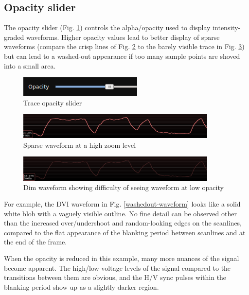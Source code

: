 \subsection{Opacity slider}

The opacity slider (Fig. \ref{opacityslider}) controls the alpha/opacity used to display intensity-graded waveforms.
Higher opacity values lead to better display of sparse waveforms (compare the crisp lines of Fig. \ref{sparse-waveform}
to the barely visible trace in Fig. \ref{dim-waveform}) but can lead to a washed-out appearance if too many sample
points are shoved into a small area.

\begin{figure}[H]
\centering
\includegraphics[height=1cm]{images/opacity-slider.png}
\caption{Trace opacity slider}
\label{opacityslider}
\end{figure}

\begin{figure}[H]
\centering
\includegraphics[width=10cm]{images/sparse-waveform.png}
\caption{Sparse waveform at a high zoom level}
\label{sparse-waveform}
\end{figure}

\begin{figure}[H]
\centering
\includegraphics[width=10cm]{images/dim-waveform.png}
\caption{Dim waveform showing difficulty of seeing waveform at low opacity}
\label{dim-waveform}
\end{figure}

For example, the DVI waveform in Fig. \ref{washedout-waveform} looks like a solid white blob with a vaguely visible
outline. No fine detail can be observed other than the increased over/undershoot and random-looking edges on the
scanlines, compared to the flat appearance of the blanking period between scanlines and at the end of the frame.

When the opacity is reduced in this example, many more nuances of the signal become apparent. The high/low voltage
levels of the signal compared to the transitions between them are obvious, and the H/V sync pulses within the blanking
period show up as a slightly darker region.

